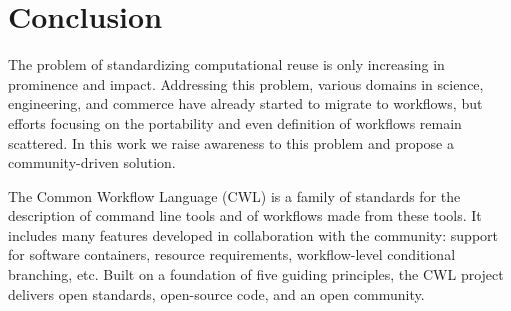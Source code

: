 \documentclass[sigconf,authordraft]{acmart}
\begin{document}

\section{Conclusion}\label{sec:conclusion}

The problem of standardizing computational reuse is only increasing in prominence and impact. Addressing this problem, various domains in science, engineering, and commerce have already started to migrate to workflows, but efforts focusing on the portability and even definition of workflows remain scattered. In this work we raise awareness to this problem and propose a community-driven solution.

The Common Workflow Language (CWL) is a family of standards for the description of command line tools and of workflows made from these tools. It includes many features developed in collaboration with the community: support for software containers, resource requirements, workflow-level conditional branching, etc. Built on a foundation of five guiding principles, the CWL project delivers open standards, open-source code, and an open community.
\end{document}
